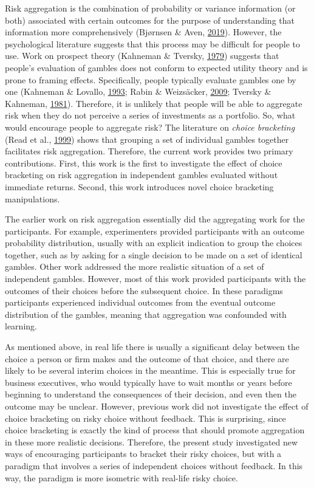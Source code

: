 \documentclass[
  english,
  man, donotrepeattitle,floatsintext]{apa7}
\theoremstyle{definition}
\theoremstyle{definition}
\theoremstyle{definition}
\theoremstyle{definition}
\theoremstyle{remark}
\begin{document}
Risk aggregation is the combination of probability or variance information (or
both) associated with certain outcomes for the purpose of understanding that
information more comprehensively (Bjørnsen \& Aven, \protect\hyperlink{ref-bjornsen2019}{2019}). However, the psychological
literature suggests that this process may be difficult for people to use. Work
on prospect theory (Kahneman \& Tversky, \protect\hyperlink{ref-kahneman1979}{1979}) suggests that people's evaluation of gambles
does not conform to expected utility theory and is prone to framing effects.
Specifically, people typically evaluate gambles one by one (Kahneman \& Lovallo, \protect\hyperlink{ref-kahneman1993}{1993}; Rabin \& Weizsäcker, \protect\hyperlink{ref-rabin2009}{2009}; Tversky \& Kahneman, \protect\hyperlink{ref-tversky1981}{1981}). Therefore, it is unlikely that people will be able
to aggregate risk when they do not perceive a series of investments as a
portfolio. So, what would encourage people to aggregate risk? The literature on
\emph{choice bracketing} (Read et al., \protect\hyperlink{ref-read1999}{1999}) shows that grouping a set of individual gambles
together facilitates risk aggregation. Therefore, the current work provides two
primary contributions. First, this work is the first to investigate the effect
of choice bracketing on risk aggregation in independent gambles evaluated
without immediate returns. Second, this work introduces novel choice bracketing
manipulations.

The earlier work on risk aggregation essentially did the aggregating work for
the participants. For example, experimenters provided participants with an
outcome probability distribution, usually with an explicit indication to group
the choices together, such as by asking for a single decision to be made on a
set of identical gambles. Other work addressed the more realistic situation of a
set of independent gambles. However, most of this work provided participants
with the outcomes of their choices before the subsequent choice. In these
paradigms participants experienced individual outcomes from the eventual outcome
distribution of the gambles, meaning that aggregation was confounded with
learning.

As mentioned above, in real life there is usually a significant delay between
the choice a person or firm makes and the outcome of that choice, and there are
likely to be several interim choices in the meantime. This is especially true
for business executives, who would typically have to wait months or years before
beginning to understand the consequences of their decision, and even then the
outcome may be unclear. However, previous work did not investigate the effect of
choice bracketing on risky choice without feedback. This is surprising, since
choice bracketing is exactly the kind of process that should promote aggregation
in these more realistic decisions. Therefore, the present study investigated new ways
of encouraging participants to bracket their risky choices, but with a paradigm
that involves a series of independent choices without feedback. In this way, the
paradigm is more isometric with real-life risky choice.
\end{document}
